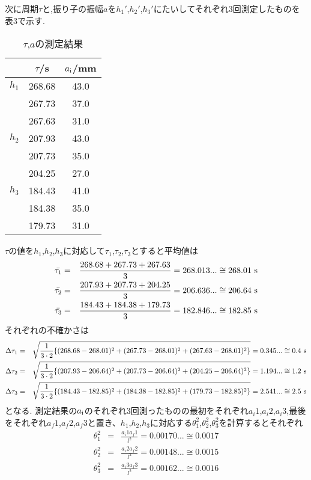 \documentclass[a4j,10pt]{jarticle}
\begin{document}
  次に周期$\tau$と,振り子の振幅$a$を$h_1'$,$h_2'$,$h_3'$にたいしてそれぞれ3回測定したものを表3で示す.
  \begin{table}[h]
    \centering
    \caption{$\tau$,$a$の測定結果}
    \begin{tabular}{c c c} \hline
        & $\tau$/s & $a_{\rm i}$/mm  \\ \hline
        {$h_1$} & 268.68 & 43.0\\
        & 267.73 & 37.0 \\
        & 267.63 & 31.0 \\
        \hline
        {$h_2$} & 207.93 & 43.0\\
        & 207.73 & 35.0 \\
        & 204.25 & 27.0 \\
         \hline
        {$h_3$} & 184.43 & 41.0\\
        & 184.38 & 35.0 \\
        & 179.73 & 31.0 \\
        \hline
    \end{tabular}
\end{table}
$\tau$の値を$h_1$,$h_2$,$h_3$に対応して$\tau_1$,$\tau_2$,$\tau_3$とすると平均値は
\begin{eqnarray*}
  \bar{\tau_1} &=& \frac{268.68+267.73+267.63}{3} =  268.013...\cong 268.01\ {\rm s} \\
  \bar{\tau_2} &=& \frac{207.93+207.73+204.25}{3} = 206.636...\cong 206.64\ {\rm s} \\
  \bar{\tau_3} &=& \frac{184.43+184.38+179.73}{3} = 182.846...\cong 182.85\ {\rm s} \\
\end{eqnarray*}
それぞれの不確かさは
\begin{eqnarray*}
  \Delta \tau_1 &=& \sqrt{ \frac{1}{3\cdot2} \{ (268.68-268.01)^2 + (267.73-268.01)^2 +(267.63-268.01)^2 \} } = 0.345... \cong 0.4\ {\rm s} \\
  \Delta \tau_2 &=& \sqrt{ \frac{1}{3\cdot2} \{ (207.93-206.64)^2 + (207.73-206.64)^2 +(204.25-206.64)^2 \} } = 1.194... \cong 1.2\ {\rm s} \\
  \Delta \tau_3 &=& \sqrt{ \frac{1}{3\cdot2} \{ (184.43-182.85)^2 + (184.38-182.85)^2 +(179.73-182.85)^2 \} } = 2.541... \cong 2.5\ {\rm s} \\
\end{eqnarray*}
となる.
測定結果の$a_{\rm i}$のそれぞれ3回測ったものの最初をそれぞれ$a_i1$,$a_i2$,$a_i3$,最後をそれぞれ$a_f1$,$a_f2$,$a_f3$と置き、$h_1$,$h_2$,$h_3$に対応する$\theta_1^2$,$\theta_2^2$,$\theta_3^2$を計算するとそれぞれ
\begin{eqnarray*}
  \theta_1^2 &=& \frac{a_i1a_f1}{l^2} = 0.00170...\cong 0.0017 \\
  \theta_2^2 &=& \frac{a_i2a_f2}{l^2} = 0.00148...\cong 0.0015 \\
  \theta_3^2 &=& \frac{a_i3a_f3}{l^2} = 0.00162...\cong 0.0016 \\
\end{eqnarray*}
\end{document}
